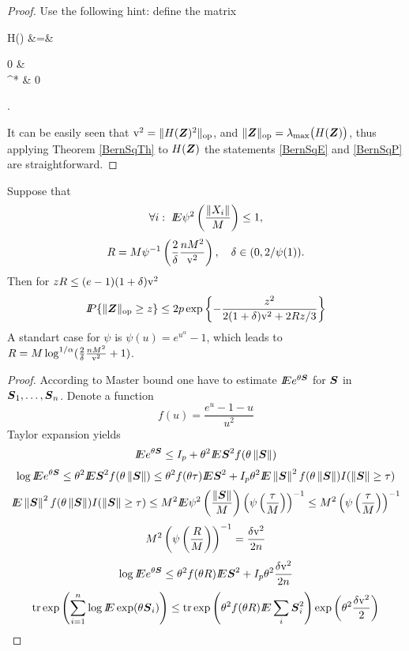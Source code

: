 \begin{proof}
Use the following hint: define the matrix
\begin{EQA}
 	H(\Zv) 
 	&=& 
 	\begin{pmatrix} 
		0 & \Zv 
		\\ 
		\Zv^{*} & 0 
	\end{pmatrix}.
\end{EQA}
It can be easily seen that \(\mathrm{v}^{2} =  \|H(\boldsymbol{Z})^{2}\|_{\operatorname{op}}\), and 
\(\|\boldsymbol{Z}\|_{\operatorname{op}} = \lambda_{\max}\bigl( H(\boldsymbol{Z}) \bigr) \), 
thus applying Theorem \ref{BernSqTh} to \( H(\boldsymbol{Z}) \) the statements \eqref{BernSqE} and \eqref{BernSqP} are straightforward.
\end{proof}


\begin{theorem}
Suppose that 
\[
\forall i: \; I\!\!E \psi^2 \left( \frac{\left\Vert X_i \right\Vert}{M} \right) \leq 1, 
\]
\[
 R = M \psi^{-1} \left( \frac{2}{\delta} \frac{n M^2}{ \mathrm{v}^{2}  } \right ),
 \quad
 \delta \in (0, 2/\psi(1)).
\]
Then for $z R \leq (e - 1)(1 + \delta) \mathrm{v}^{2}$ 
\[
I\!\!P\{\| \boldsymbol{Z} \|_{\operatorname{op}} \geq z \} \leq 2p \exp \left \{ - \frac{z^2}{ 2(1 + \delta) \mathrm{v}^2 + 2R z/3 } \right \} 
\]
A standart case for $\psi$ is $\psi(u) = e^{u^{\alpha}} - 1$, which leads to $R = M \log^{1/\alpha} ( \frac{2}{\delta} \frac{n M^2}{ \mathrm{v}^{2}  }  + 1)$.
\end{theorem}

\begin{proof}
According to Master bound one have to estimate $I\!\!E e^{\theta \boldsymbol{S} }$ for $\boldsymbol{S}$ in $\boldsymbol{S}_1,\ldots,\boldsymbol{S}_n$. Denote a  function 
\[
f(u) = \frac{e^u - 1 - u}{u^2}
\]
Taylor expansion yields 
\[
I\!\!E e^{\theta \boldsymbol{S} } \leq I_p + \theta^2 I\!\!E \boldsymbol{S}^2 f(\theta \left\Vert \boldsymbol{S} \right\Vert)
\] 
\[
\log \E e^{\theta \Sv } \leq \theta^2 \E \Sv^2 f(\theta \normp{\Sv}) \leq 
\theta^2 f(\theta \tau) \E \Sv^2  + I_p \theta^2 \E \normp{\Sv}^2 f(\theta \normp{\Sv}) I(\normp{\Sv} \geq \tau)
\]
\[
I\!\!E \left\Vert \boldsymbol{S} \right\Vert^2 f(\theta \left\Vert \boldsymbol{S} \right\Vert) I(\left\Vert \boldsymbol{S} \right\Vert \geq \tau) \leq
M^2 I\!\!E \psi^2 \left( \frac{\left\Vert \boldsymbol{S} \right\Vert}{M} \right) \left( \psi \left( \frac{\tau}{M} \right) \right)^{-1}
\leq 
M^2 \left( \psi \left( \frac{\tau}{M} \right) \right)^{-1}
 \]
 \[
 M^2 \left( \psi \left( \frac{R}{M} \right) \right)^{-1} = \frac{\delta \mathrm{v}^2}{2n}
 \]
 \[
 \log I\!\!E e^{\theta \boldsymbol{S} } \leq 
\theta^2 f(\theta R) I\!\!E \boldsymbol{S}^2  + I_p \theta^2  \frac{\delta \mathrm{v}^2}{2n}
 \]
 \[
  \operatorname{tr}\exp \left( \sum_{i=1}^{n} \log I\!\!E\exp(\theta \boldsymbol{S}_{i})\right) \leq 
  \operatorname{tr}\exp \left( \theta^2 f(\theta R) I\!\!E \sum_i \boldsymbol{S}_i^2 \right) \exp \left(    \theta^2  \frac{\delta \mathrm{v}^2}{2} \right)
 \]

\end{proof}

